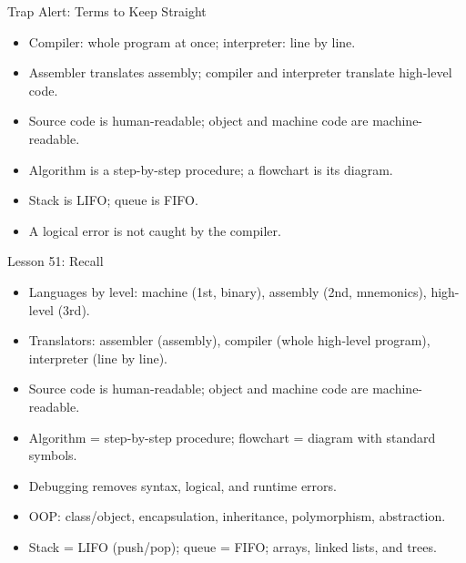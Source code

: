 \documentclass[aspectratio=169]{beamer}
\begin{document}
\begin{frame}{Trap Alert: Terms to Keep Straight}
  \begin{itemize}
    \item Compiler: whole program at once; interpreter: line by line.
    \item Assembler translates assembly; compiler and interpreter translate
      high-level code.
    \item Source code is human-readable; object and machine code are
      machine-readable.
    \item Algorithm is a step-by-step procedure; a flowchart is its
      diagram.
    \item Stack is LIFO; queue is FIFO.
    \item A logical error is not caught by the compiler.
  \end{itemize}
\end{frame}

\begin{frame}{Lesson 51: Recall}
  \begin{itemize}
    \item Languages by level: machine (1st, binary), assembly (2nd,
      mnemonics), high-level (3rd).
    \item Translators: assembler (assembly), compiler (whole high-level
      program), interpreter (line by line).
    \item Source code is human-readable; object and machine code are
      machine-readable.
    \item Algorithm = step-by-step procedure; flowchart = diagram with
      standard symbols.
    \item Debugging removes syntax, logical, and runtime errors.
    \item OOP: class/object, encapsulation, inheritance, polymorphism,
      abstraction.
    \item Stack = LIFO (push/pop); queue = FIFO; arrays, linked lists, and
      trees.
  \end{itemize}
\end{frame}
\end{document}
